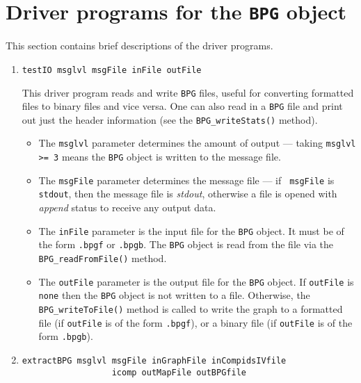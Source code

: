 \par
\section{Driver programs for the {\tt BPG} object}
\label{section:BPG:drivers}
\par
This section contains brief descriptions of the driver programs.
\par
\begin{enumerate}
\item
\begin{verbatim}
testIO msglvl msgFile inFile outFile
\end{verbatim}
This driver program reads and write {\tt BPG} files, useful for
converting formatted files to binary files and vice versa.
One can also read in a {\tt BPG} file and print out just the 
header information (see the {\tt BPG\_writeStats()} method).
\par
\begin{itemize}
\item
The {\tt msglvl} parameter determines the amount of output ---
taking {\tt msglvl >= 3} means the {\tt BPG} object is written
to the message file.
\item
The {\tt msgFile} parameter determines the message file --- if {\tt
msgFile} is {\tt stdout}, then the message file is {\it stdout},
otherwise a file is opened with {\it append} status to receive any
output data.
\item
The {\tt inFile} parameter is the input file for the {\tt BPG}
object. It must be of the form {\tt *.bpgf} or {\tt *.bpgb}.
The {\tt BPG} object is read from the file via the
{\tt BPG\_readFromFile()} method.
\item
The {\tt outFile} parameter is the output file for the {\tt BPG}
object. 
If {\tt outFile} is {\tt none} then the {\tt BPG} object is not
written to a file. 
Otherwise, the {\tt BPG\_writeToFile()} method is called to write
the graph to 
a formatted file (if {\tt outFile} is of the form {\tt *.bpgf}),
or
a binary file (if {\tt outFile} is of the form {\tt *.bpgb}).
\end{itemize}
\item
\begin{verbatim}
extractBPG msglvl msgFile inGraphFile inCompidsIVfile 
                  icomp outMapFile outBPGfile 

\end{verbatim}
\end{enumerate}
